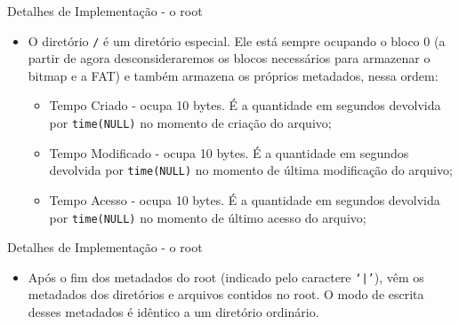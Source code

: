 \documentclass[10pt]{beamer}
\begin{document}
    \begin{frame}{Detalhes de Implementação - o root}
        \begin{itemize}
            \justifying
            \item O diretório \texttt{/} é um diretório especial. Ele está
                sempre ocupando o bloco 0 (a partir de agora desconsideraremos
                os blocos necessários para armazenar o bitmap e a FAT) e também
                armazena os próprios metadados, nessa ordem:
            \begin{itemize}
                \justifying
                \item Tempo Criado - ocupa 10 bytes. É a quantidade em segundos
                    devolvida por \texttt{time(NULL)} no momento de criação do
                    arquivo;
                \item Tempo Modificado - ocupa 10 bytes. É a quantidade em
                    segundos devolvida por \texttt{time(NULL)} no momento de
                    última modificação do arquivo;
                \item Tempo Acesso - ocupa 10 bytes. É a quantidade em segundos
                    devolvida por \texttt{time(NULL)} no momento de último
                    acesso do arquivo;
            \end{itemize}
        \end{itemize}
    \end{frame}
    \begin{frame}{Detalhes de Implementação - o root}
        \begin{itemize}
            \justifying
            \begin{itemize}
                \justifying
                \item Nome - ocupa um número variado de bytes. Ao fim do nome
                    estará o caractere \texttt{`|'}.
            \end{itemize}
        \item Após o fim dos metadados do root (indicado pelo caractere
            \texttt{`|'}), vêm os metadados dos diretórios e arquivos contidos
            no root. O modo de escrita desses metadados é idêntico a um
            diretório ordinário.
        \end{itemize}
    \end{frame}
\end{document}
